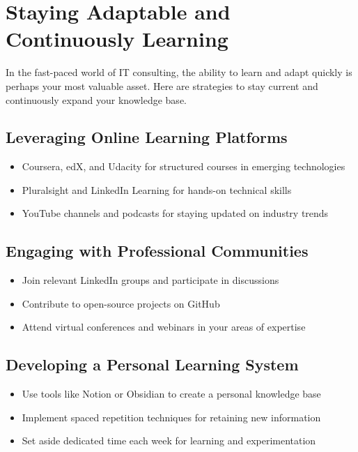 
\section{Staying Adaptable and Continuously Learning}

In the fast-paced world of IT consulting, the ability to learn and adapt quickly is perhaps your most valuable asset. Here are strategies to stay current and continuously expand your knowledge base.

\subsection{Leveraging Online Learning Platforms}

\begin{itemize}
    \item Coursera, edX, and Udacity for structured courses in emerging technologies
    \item Pluralsight and LinkedIn Learning for hands-on technical skills
    \item YouTube channels and podcasts for staying updated on industry trends
\end{itemize}

\subsection{Engaging with Professional Communities}

\begin{itemize}
    \item Join relevant LinkedIn groups and participate in discussions
    \item Contribute to open-source projects on GitHub
    \item Attend virtual conferences and webinars in your areas of expertise
\end{itemize}

\subsection{Developing a Personal Learning System}

\begin{itemize}
    \item Use tools like Notion or Obsidian to create a personal knowledge base
    \item Implement spaced repetition techniques for retaining new information
    \item Set aside dedicated time each week for learning and experimentation
\end{itemize}

